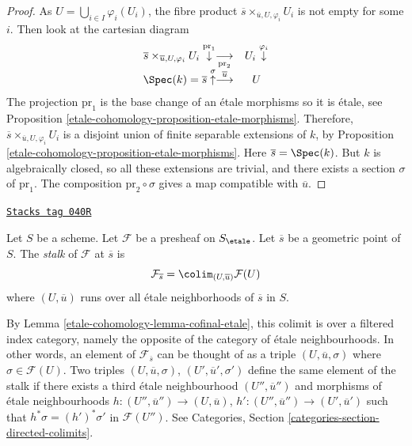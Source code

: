 \begin{proof}
As $U = \bigcup_{i\in I} \varphi_i(U_i)$, the fibre product
$\overline{s} \times_{\overline{u}, U, \varphi_i} U_i$ is not empty
for some $i$. Then look at the cartesian diagram
$$
\begin{array}{cc}\overline{s} \times_{\overline{u}, U, \varphi_i} U_i
\overset{\text{pr}_1}{\downarrow}\underset{\text{pr}_2}{\longrightarrow} & U_i
\overset{\varphi_i}{\downarrow} \\ \Spec(k) = \overline{s} \overset{\sigma}{\uparrow}\overset{\overline{u}}{\longrightarrow} & U\end{array}
$$
The projection $\text{pr}_1$ is the base change of an \'etale morphisms so it
is \'etale, see
Proposition \ref{etale-cohomology-proposition-etale-morphisms}.
Therefore, $\overline{s} \times_{\overline{u}, U, \varphi_i} U_i$
is a disjoint union of finite separable extensions of $k$, by
Proposition \ref{etale-cohomology-proposition-etale-morphisms}. Here
$\overline{s} = \Spec(k)$. But $k$ is algebraically closed, so all
these extensions are trivial, and there exists a section $\sigma$ of
$\text{pr}_1$. The composition
$\text{pr}_2 \circ \sigma$ gives a map compatible with $\overline{u}$.
\end{proof}

\begin{definition}[Stalk]
\label{etale-cohomology-definition-stalk}
\href{https://stacks.math.columbia.edu/tag/040R}{\texttt{Stacks tag 040R}}

Let $S$ be a scheme.
Let $\mathcal{F}$ be a presheaf on $S_\etale$.
Let $\overline{s}$ be a geometric point of $S$.
The {\it stalk} of $\mathcal{F}$ at $\overline{s}$ is
$$
\mathcal{F}_{\overline{s}}
=
\colim_{(U, \overline{u})} \mathcal{F}(U)
$$
where $(U, \overline{u})$ runs over all \'etale
neighborhoods of $\overline{s}$ in $S$.
\end{definition}

By Lemma \ref{etale-cohomology-lemma-cofinal-etale}, this colimit is over a filtered
index category, namely the opposite of the category of \'etale neighbourhoods.
In other words, an element of $\mathcal{F}_{\overline{s}}$ can be
thought of as a triple $(U, \overline{u}, \sigma)$ where
$\sigma \in \mathcal{F}(U)$. Two triples
$(U, \overline{u}, \sigma)$, $(U', \overline{u}', \sigma')$
define the same element of the stalk if there exists a third
\'etale neighbourhood $(U'', \overline{u}'')$ and morphisms of \'etale
neighbourhoods $h : (U'', \overline{u}'') \to (U, \overline{u})$,
$h' : (U'', \overline{u}'') \to (U', \overline{u}')$ such that
$h^*\sigma = (h')^*\sigma'$ in $\mathcal{F}(U'')$. See
Categories, Section \ref{categories-section-directed-colimits}.

